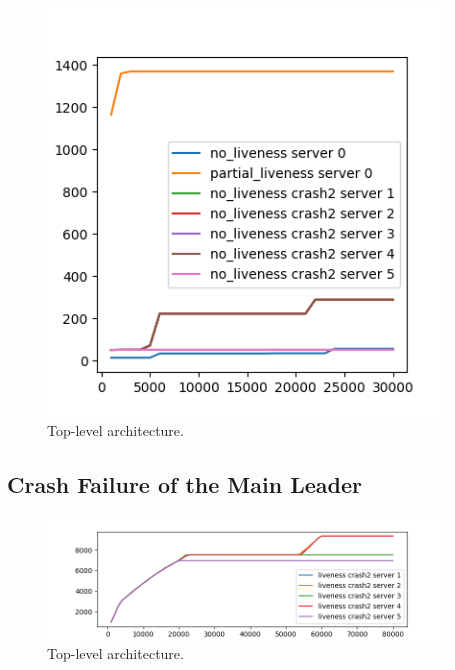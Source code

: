 \documentclass[11pt]{article}
\begin{document}
\begin{figure}[H]
    \centering
    \includegraphics[width=400px]{crash2_no_liveness_plus_partial.png}
    \caption{Top-level architecture.}
    \vspace{-15pt}
\end{figure}
\subsection*{Crash Failure of the Main Leader}
\begin{figure}[H]
    \centering
    \includegraphics[width=400px]{crash2_liveness.png}
    \caption{Top-level architecture.}
    \vspace{-15pt}
\end{figure}
\end{document}
